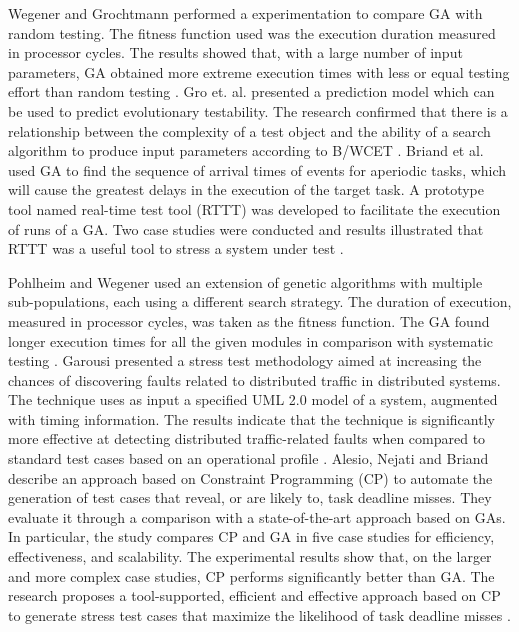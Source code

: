 \documentclass[espaco=umemeio,chapter=TITLE,twoside,openright]{abnt}
\begin{document}
Wegener and Grochtmann performed a  experimentation
to compare GA with random testing. The fitness function used was the execution duration measured in processor cycles.  The results showed that, with a large number of input parameters, GA obtained more extreme execution times with less or equal testing effort than random testing \cite{J.WegenerK.GrimmM.GrochtmannH.Sthamer1996} \cite{Wegener1998}. Gro et. al. \cite{Gross2000} presented a prediction model  which can be used to predict evolutionary testability. The research confirmed that there is a relationship between the complexity of a test object and the ability of a search algorithm to produce input parameters according to B/WCET \cite{Gross2000}. Briand et al. \cite{Briand2005} used GA to find the sequence of arrival times of events for aperiodic tasks, which will cause the greatest delays in the execution of the target task. A prototype tool named real-time test tool (RTTT) was developed to facilitate the execution of runs of a GA. Two case studies were conducted and results illustrated that RTTT was a useful tool to stress a system under test \cite{Briand2005}.


Pohlheim and Wegener used an extension of genetic algorithms with multiple sub-populations, each using a different search strategy. The duration of execution, measured in processor cycles, was taken as the fitness
function. The GA found longer execution times for all the given modules in comparison with systematic testing \cite{Pohlheim2005}. Garousi presented a stress test methodology aimed at increasing the chances of discovering faults related to distributed traffic in distributed systems. The technique uses as input a specified UML 2.0 model of a system, augmented with timing information. The results indicate that the technique is significantly more effective at detecting distributed traffic-related faults when compared to standard test cases based on an operational profile \cite{Garousi2006}. Alesio, Nejati and Briand describe an approach based
on Constraint Programming (CP) to automate the generation of test cases that reveal, or are likely to, task deadline misses. They evaluate it through a comparison with a state-of-the-art approach based on GAs. In particular, the study compares CP and GA in five case studies for efficiency, effectiveness, and scalability. The experimental results show that, on the larger and more complex case studies, CP performs significantly better than GA. The research proposes a tool-supported, efficient and effective approach based on CP to generate stress test cases that maximize the likelihood of task deadline misses \cite{DiAlesio2013}.
\end{document}
